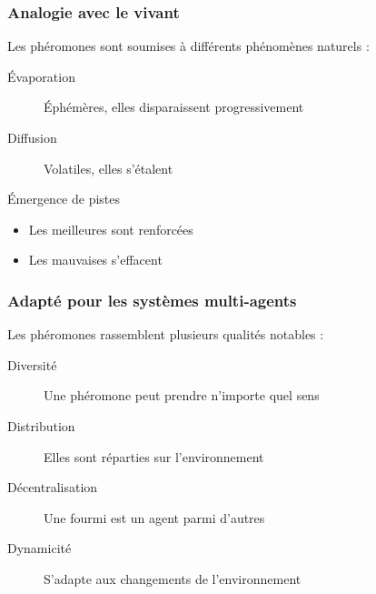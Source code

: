 \documentclass{beamer}
\begin{document}
\begin{frame}

  \frametitle{Analogie avec le vivant}

  Les phéromones sont soumises à différents phénomènes naturels :
  \begin{description}
    \item[\'Evaporation]{\'Ephémères, elles disparaissent progressivement}
    \item[Diffusion]{Volatiles, elles s'étalent}
  \end{description}

  \vfill

  \begin{block}{\'Emergence de pistes}
    \begin{itemize}
    \item{Les meilleures sont renforcées}
    \item{Les mauvaises s'effacent}
    \end{itemize}
  \end{block}

\end{frame}

\begin{frame}

  \frametitle{Adapté pour les systèmes multi-agents}

  Les phéromones rassemblent plusieurs qualités notables :

  \vfill

  \begin{block}{}
    \begin{description}
    \item[Diversité]{Une phéromone peut prendre n'importe quel sens}
    \item[Distribution]{Elles sont réparties sur l'environnement}
    \item[Décentralisation]{Une fourmi est un agent parmi d'autres}
    \item[Dynamicité]{S'adapte aux changements de l'environnement}
    \end{description}
  \end{block}

\end{frame}
\end{document}
